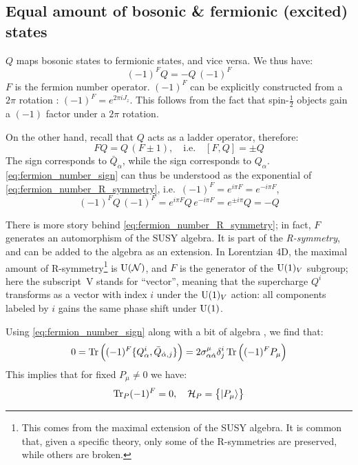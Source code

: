 \documentclass[a4paper
	,10pt
]{article}
\begin{document}
\subsection{Equal amount of bosonic \& fermionic (excited) states}
	$Q$ maps bosonic states to fermionic states, and vice versa. We thus have:
	\begin{equation}
		(-1)^F Q = - Q\,(-1)^F
	\label{eq:fermion_number_sign}
	\end{equation}
	$F$ is the fermion number operator. $(-1)^F$ can be explicitly constructed from a $2\pi$ rotation \cite{Argyres:1996abc,Witten:1982df}: \mbox{$
		(-1)^F = e^{2\pi i J_z}
	$}. This follows from the fact that spin-$\frac{1}{2}$ objects gain a $(-1)$ factor under a $2\pi$ rotation. 
	
	On the other hand, recall that $Q$ acts as a ladder operator, therefore:
	\begin{equation}
		F Q = Q\,(F \pm 1),
	\quad\text{i.e.}\quad
		[F, Q] = \pm Q
	\label{eq:fermion_number_R_symmetry}
	\end{equation}
	The \mquote{+} sign corresponds to $\bar{Q}_{\dot{\alpha}}$, while the \mquote{-} sign corresponds to $Q_\alpha$. 
	\eqref{eq:fermion_number_sign} can thus be understood as the exponential of \eqref{eq:fermion_number_R_symmetry}, i.e.\ $(-1)^F = e^{i\pi F} = e^{-i\pi F}$,
	\begin{equation}
		(-1)^F Q\,(-1)^F
		= e^{i\pi F} Q\,e^{-i\pi F}
		= e^{\pm i\pi} Q
		= -Q
	\end{equation}
	
	There is more story behind \eqref{eq:fermion_number_R_symmetry}; in fact, $F$ generates an automorphism of the SUSY algebra. It is part of the \textit{R-symmetry}, and can be added to the algebra as an extension. 
	In Lorentzian 4D, the maximal amount of R-symmetry\footnote{
		This comes from the maximal extension of the SUSY algebra. It is common that, given a specific theory, only some of the R-symmetries are preserved, while others are broken. 
	} is $\mathrm{U}(\mathcal{N})$, and $F$ is the generator of the $\mathrm{U}(1)_V$ subgroup; here the \mbox{subscript V} stands for ``vector'', meaning that the supercharge $Q^i$ transforms as a vector with index $i$ under the $\mathrm{U}(1)_V$ action: all components labeled by $i$ gains the same phase shift under $\mathrm{U}(1)$. 
	
	\newparagraph
	Using \eqref{eq:fermion_number_sign} along with a bit of algebra \cite{Wess:1992cp}, we find that:
	\begin{equation}
		0 = \Tr \pqty\Big{
			(-1)^F
			\{ Q^i_\alpha, \bar{Q}_{\dot{\alpha},j} \}
		}
		= 2\sigma^\mu_{\alpha\dot{\alpha}} \delta^i_j
			\Tr \pqty\Big{
			(-1)^F P_\mu
		}
	\end{equation}
	This implies that for fixed $P_\mu \ne 0$ we have:
	\begin{equation}
		\Tr_P (-1)^F = 0,
	\quad
		\mcal{H}_P = \Bqty\big{ \ket{P_\mu} }
	\end{equation}
	
\end{document}
